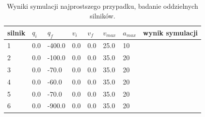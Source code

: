 \documentclass[a4paper, 12pt]{article}
\begin{document}
	\begin{table}[H]
	\centering
	\begin{tabular}{|m{2.5em}|m{4em}|m{4em}|m{4em}|m{4em}|m{4em}|m{4em}|m{5em}|}
	\hline
	silnik&$ q_i $ & $ q_f $ & $ v_i $ & $ v_f $ & $ v_{max} $ & $ a_{max} $&wynik symulacji\\
	\hline
	\hline
	\hspace{1em}1& 0.0 & -400.0 & 0.0 & 0.0 & 25.0 & 10&\hspace{2em}\checkmark\\ %
	\hline
	\hspace{1em}2& 0.0 & -100.0 & 0.0 & 0.0 & 35.0 & 20&\hspace{2em}\checkmark\\ %
	\hline
	\hspace{1em}3& 0.0 & -70.0 & 0.0 & 0.0 & 35.0 & 20&\hspace{2em}\checkmark\\ %
	\hline
	\hspace{1em}4& 0.0 & -60.0 & 0.0 & 0.0 & 35.0 & 20&\hspace{2em}\checkmark\\  %
	\hline
	\hspace{1em}5& 0.0 & -70.0 & 0.0 & 0.0 & 35.0 & 20&\hspace{2em}\checkmark\\  %
	\hline
	\hspace{1em}6& 0.0 & -900.0 & 0.0 & 0.0 & 35.0 & 20&\hspace{2em}\checkmark\\  %
	\hline
	\end{tabular}
	\caption{Wyniki symulacji najprostszego przypadku, badanie oddzielnych silników.}
	\label{tab:simpJPVrevers}
	\end{table}
\end{document}
